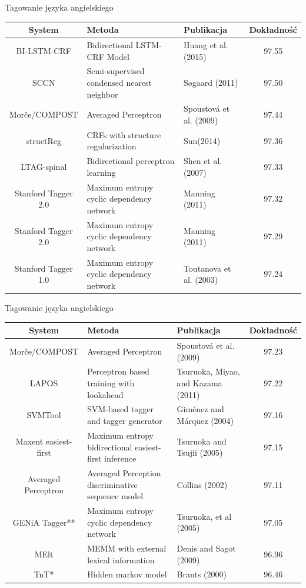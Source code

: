 \documentclass[xcolor=dvipsnames,polish]{beamer}
\begin{document}
\begin{frame}{Tagowanie języka angielskiego}
  \footnotesize
  \begin{tabular}{cp{3.5cm}p{2.5cm}c}
    System & Metoda & Publikacja & Dokładność \\ \hline
    BI-LSTM-CRF & Bidirectional LSTM-CRF Model & Huang et al. (2015) & 97.55 \\ \hline
    SCCN & Semi-supervised condensed nearest neighbor & Søgaard (2011) & 97.50 \\ \hline
    Morče/COMPOST & Averaged Perceptron & Spoustová et al. (2009) & 97.44 \\ \hline
    structReg & CRFs with structure regularization & Sun(2014) & 97.36 \\ \hline
    LTAG-spinal & Bidirectional perceptron learning & Shen et al. (2007) & 97.33 \\ \hline
    Stanford Tagger 2.0 & Maximum entropy cyclic dependency network & Manning (2011) & 97.32 \\ \hline
    Stanford Tagger 2.0 & Maximum entropy cyclic dependency network & Manning (2011) & 97.29 \\ \hline
    Stanford Tagger 1.0 & Maximum entropy cyclic dependency network & Toutanova et al. (2003) & 97.24 \\ \hline
  \end{tabular}
\end{frame}

\begin{frame}{Tagowanie języka angielskiego}
  \footnotesize
  \begin{tabular}{cp{3.5cm}p{2.5cm}c}
    System & Metoda & Publikacja & Dokładność \\ \hline
    Morče/COMPOST & Averaged Perceptron & Spoustová et al. (2009) & 97.23 \\ \hline
    LAPOS & Perceptron based training with lookahead & Tsuruoka, Miyao, and Kazama (2011) & 97.22 \\ \hline
    SVMTool & SVM-based tagger and tagger generator & Giménez and Márquez (2004) & 97.16 \\ \hline
    Maxent easiest-first & Maximum entropy bidirectional easiest-first inference & Tsuruoka and Tsujii (2005) & 97.15 \\ \hline
    Averaged Perceptron & Averaged Perception discriminative sequence model & Collins (2002) & 97.11 \\ \hline
    GENiA Tagger** & Maximum entropy cyclic dependency network & Tsuruoka, et al (2005) & 97.05 \\ \hline
    MElt & MEMM with external lexical information & Denis and Sagot (2009) & 96.96 \\ \hline
    TnT* & Hidden markov model & Brants (2000) & 96.46 \\ \hline
\end{tabular}
\end{frame}
\end{document}
